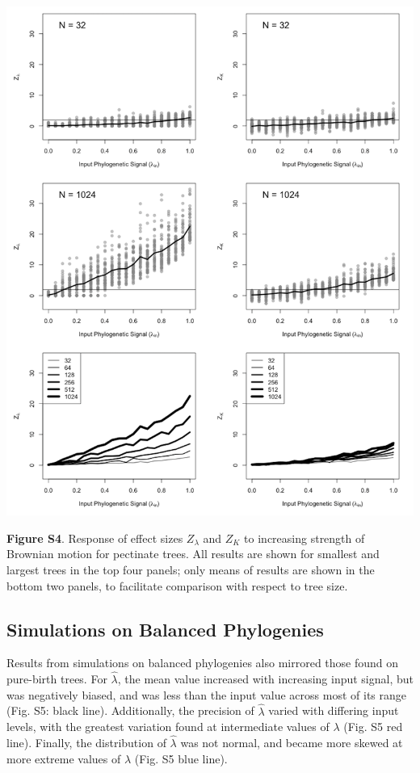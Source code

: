 \documentclass[
]{article}
\begin{document}
\includegraphics[width=0.95\linewidth]{fig.S4}

\textbf{Figure S4}. Response of effect sizes \(Z_{\lambda}\) and \(Z_K\)
to increasing strength of Brownian motion for pectinate trees. All
results are shown for smallest and largest trees in the top four panels;
only means of results are shown in the bottom two panels, to facilitate
comparison with respect to tree size.

\newpage

\hypertarget{simulations-on-balanced-phylogenies}{%
\subsection{Simulations on Balanced
Phylogenies}\label{simulations-on-balanced-phylogenies}}

Results from simulations on balanced phylogenies also mirrored those
found on pure-birth trees. For \(\hat{\lambda}\), the mean value
increased with increasing input signal, but was negatively biased, and
was less than the input value across most of its range (Fig. S5: black
line). Additionally, the precision of \(\hat{\lambda}\) varied with
differing input levels, with the greatest variation found at
intermediate values of \(\lambda\) (Fig. S5 red line). Finally, the
distribution of \(\hat{\lambda}\) was not normal, and became more skewed
at more extreme values of \(\lambda\) (Fig. S5 blue line). \hfill\break
\end{document}

